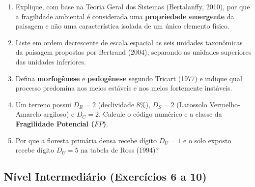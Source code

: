 \begin{enumerate}[leftmargin=1.8em, itemsep=4pt]
  \item Explique, com base na Teoria Geral dos Sistemas (Bertalanffy, 2010), por que a fragilidade ambiental é considerada uma \textbf{propriedade emergente} da paisagem e não uma característica isolada de um único elemento físico.
  \espacoResolucao[1.8cm]

  \item Liste em ordem decrescente de escala espacial as seis unidades taxonômicas da paisagem propostas por Bertrand (2004), separando as unidades superiores das unidades inferiores.
  \espacoResolucao[1.8cm]

  \item Defina \textbf{morfogênese} e \textbf{pedogênese} segundo Tricart (1977) e indique qual processo predomina nos meios estáveis e nos meios fortemente instáveis.
  \espacoResolucao[1.8cm]

  \item Um terreno possui $D_R = 2$ (declividade $8\%$), $D_S = 2$ (Latossolo Vermelho-Amarelo argiloso) e $D_C = 2$. Calcule o código numérico e a classe da \textbf{Fragilidade Potencial ($FP$)}.
  \espacoResolucao[1.6cm]

  \item Por que a floresta primária densa recebe dígito $D_U = 1$ e o solo exposto recebe dígito $D_U = 5$ na tabela de Ross (1994)?
  \espacoResolucao[1.6cm]
\end{enumerate}

\subsection*{Nível Intermediário (Exercícios 6 a 10)}

